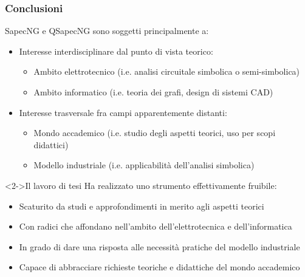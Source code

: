 \begin{frame}
 \frametitle{Conclusioni}

 SapecNG e QSapecNG sono soggetti principalmente a:
 \begin{itemize}
  \item Interesse interdisciplinare dal punto di vista teorico:
    \begin{itemize}
     \item Ambito elettrotecnico (i.e. analisi circuitale simbolica o semi-simbolica)
     \item Ambito informatico (i.e. teoria dei grafi, design di sistemi CAD)
    \end{itemize}
  \item Interesse trasversale fra campi apparentemente distanti:
    \begin{itemize}
     \item Mondo accademico (i.e. studio degli aspetti teorici, uso per scopi didattici)
     \item Modello industriale (i.e. applicabilità dell'analisi simbolica)
    \end{itemize}
 \end{itemize}

 \bigskip

 \begin{block}<2->{Il lavoro di tesi}
  Ha realizzato uno strumento effettivamente fruibile:
  \begin{itemize}
   \item Scaturito da studi e approfondimenti in merito agli aspetti teorici
   \item Con radici che affondano nell'ambito dell'elettrotecnica e dell'informatica
   \item In grado di dare una risposta alle necessità pratiche del modello industriale
   \item Capace di abbracciare richieste teoriche e didattiche del mondo accademico
  \end{itemize}
 \end{block}

\end{frame}
